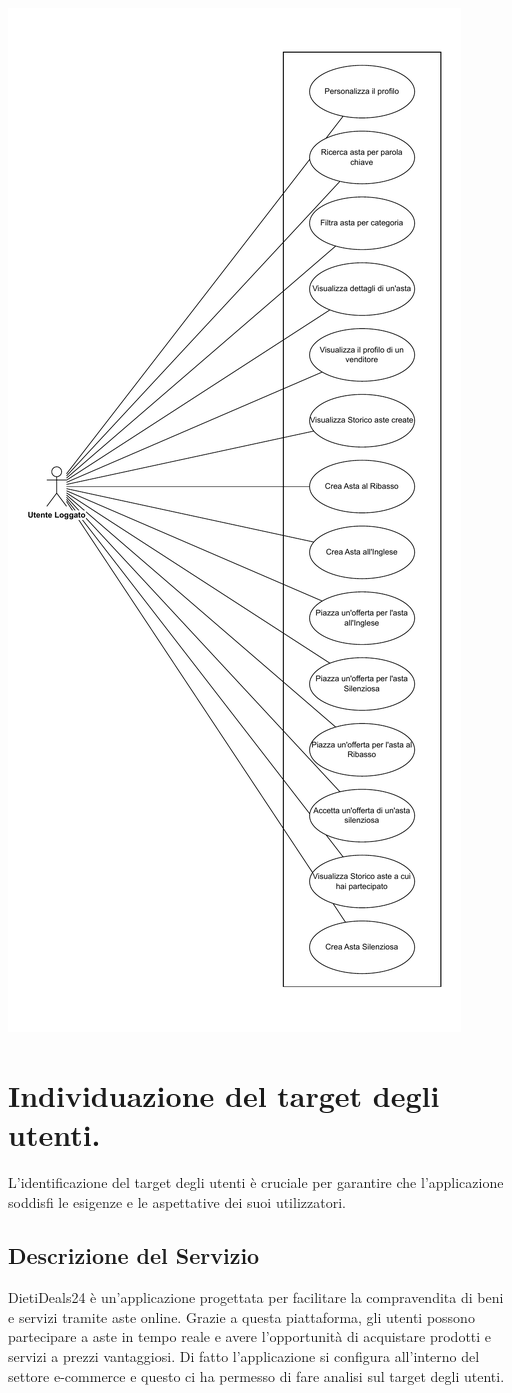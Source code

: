 \includegraphics[width=.63\textwidth]{assets/utente_loggato_use_case.pdf}

\newpage

\section{Individuazione del target degli utenti.}
L'identificazione del target degli utenti è cruciale per garantire che l'applicazione soddisfi le esigenze e le aspettative dei suoi utilizzatori.

\subsection{Descrizione del Servizio}
DietiDeals24 è un'applicazione progettata per facilitare la compravendita di beni e servizi tramite aste online.
Grazie a questa piattaforma, gli utenti possono partecipare a aste in tempo reale e avere l'opportunità di acquistare prodotti e servizi a prezzi vantaggiosi.\sskip
Di fatto l'applicazione si configura all'interno del settore e-commerce e questo ci ha permesso di fare analisi sul target degli utenti.

